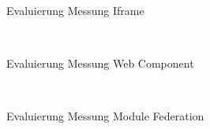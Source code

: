 \begin{figure}[hbt!]
	\centering
	\begin{minipage}[t]{1\textwidth}	
		\caption{Evaluierung Messung Iframe}
		\\ %
		\label{fig:MessungIFrame}
	\end{minipage}
\end{figure}

\newpage
\begin{figure}[hbt!]
	\centering
	\begin{minipage}[t]{1\textwidth}	
		\caption{Evaluierung Messung Web Component}
		\\ %
		\label{fig:MessungWebComponent}
	\end{minipage}
\end{figure}

\begin{figure}[hbt!]
	\centering
	\begin{minipage}[t]{1\textwidth}	
		\caption{Evaluierung Messung Module Federation}
		\\ %
		\label{fig:MessungModuleFederation}
	\end{minipage}
\end{figure}


